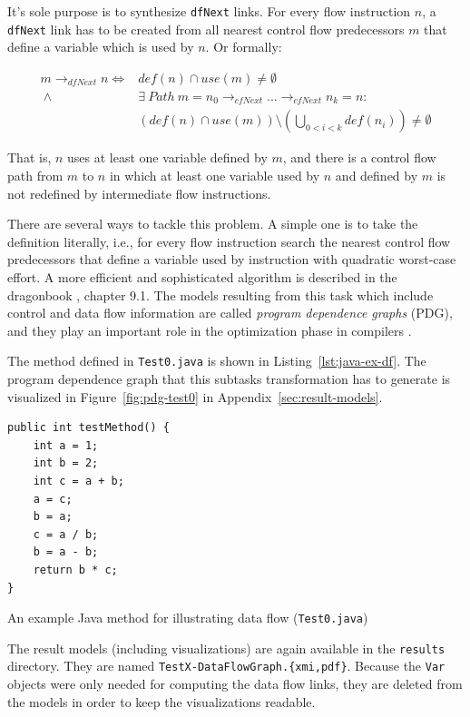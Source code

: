 \documentclass[11pt]{article}
\begin{document}
It's sole purpose is to synthesize \verb|dfNext| links.  For every flow
instruction $n$, a \verb|dfNext| link has to be created from all nearest
control flow predecessors $m$ that define a variable which is used by $n$.  Or
formally:

\begin{align*}
  m \rightarrow_{dfNext} n  \iff {} & def(n) \cap use(m) \neq \emptyset\\
  ~\land {} & \exists~Path~m = n_0 \rightarrow_{cfNext} ... \rightarrow_{cfNext} n_k = n:\\
  & \left(def(n) \cap use(m)\right) \setminus \left(\bigcup_{0 < i < k}
    def(n_i)\right) \neq \emptyset
\end{align*}

That is, $n$ uses at least one variable defined by $m$, and there is a control
flow path from $m$ to $n$ in which at least one variable used by $n$ and
defined by $m$ is not redefined by intermediate flow instructions.

There are several ways to tackle this problem.  A simple one is to take the
definition literally, i.e., for every flow instruction search the nearest
control flow predecessors that define a variable used by instruction with
quadratic worst-case effort.  A more efficient and sophisticated algorithm is
described in the dragonbook \cite{Aho:CPTT}, chapter 9.1.  The models resulting
from this task which include control and data flow information are called
\emph{program dependence graphs} (PDG), and they play an important role in the
optimization phase in compilers \cite{Ferrante:1987:PDG:24039.24041}.

The method defined in \verb|Test0.java| is shown in
Listing~\ref{lst:java-ex-df}.  The program dependence graph that this subtasks
transformation has to generate is visualized in Figure~\ref{fig:pdg-test0} in
Appendix~\ref{sec:result-models}.

\begin{listing}
  \begin{verbatim}
public int testMethod() {
    int a = 1;
    int b = 2;
    int c = a + b;
    a = c;
    b = a;
    c = a / b;
    b = a - b;
    return b * c;
}
  \end{verbatim}
  \caption{An example Java method for illustrating data flow
    (\texttt{Test0.java})}
  \label{lst:java-ex-df}
\end{listing}


The result models (including visualizations) are again available in the
\verb|results| directory.  They are named \verb|TestX-DataFlowGraph.{xmi,pdf}|.
Because the \verb|Var| objects were only needed for computing the data flow
links, they are deleted from the models in order to keep the visualizations
readable.
\end{document}
